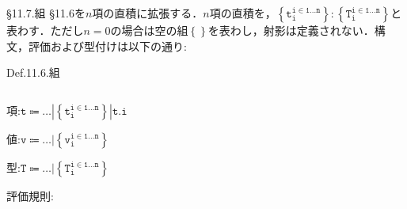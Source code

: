 \documentclass[9pt]{beamer}
\begin{document}
\begin{frame}{\S11.7.組}
\S11.6を$n$項の直積に拡張する．$n$項の直積を，$\left\{\mathtt{t_{i}^{i\in 1\ldots n}}\right\}:\left\{\mathtt{T_{i}^{i\in 1\ldots n}}\right\}$と表わす．ただし$n = 0$の場合は空の組$\left\{\right\}$を表わし，射影は定義されない．構文，評価および型付けは以下の通り:\begin{alertblock}{Def.11.6.組}
\begin{columns}
\begin{column}{0.18\columnwidth}
項:$\mathtt{t\Coloneq\ldots|\left\{t_{i}^{i\in 1\ldots n}\right\}|t.i}$

値:$\mathtt{v\Coloneq\ldots|\left\{v_{i}^{i\in 1\ldots n}\right\}}$

型:$\mathtt{T\Coloneq\ldots|\left\{T_{i}^{i \in 1\ldots n}\right\}}$

評価規則:
\begin{prooftree}
\end{prooftree}
\end{column}
\begin{column}{0.7\columnwidth}
    \begin{prooftree}
        \end{prooftree}
\begin{prooftree}
\end{prooftree}
\begin{prooftree}
\end{prooftree}
\begin{prooftree}
\end{prooftree}
\end{column}
\end{columns}
\end{alertblock}
\end{frame}
\end{document}
